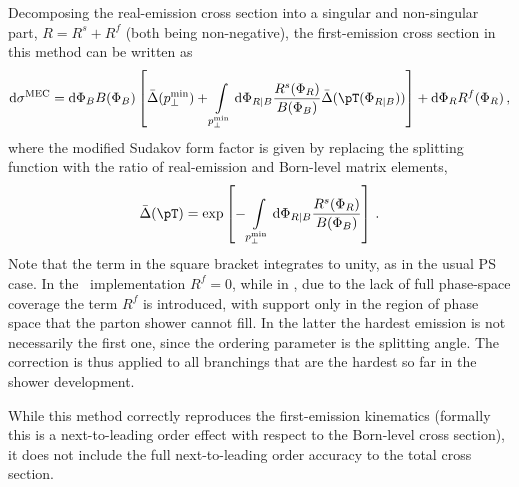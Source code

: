 Decomposing the real-emission cross section into a singular and non-singular 
part, $R=R^{s}+R^{f}$ (both being non-negative), the first-emission 
cross section in this method can be written as
\begin{equation}\label{Eq:MEC}
{\rm d}\sigma^{\rm MEC} =
{\rm d}\Phi_B B(\Phi_B)
\left[\bar\Delta(\pperpmin)+\int\limits_{\pperpmin}{\rm d}\Phi_{R|B}
      \frac{R^{s}(\Phi_R)}{B(\Phi_B)}
      \bar\Delta(\pT(\Phi_{R|B}))\right]
+ {\rm d}\Phi_R R^{f}(\Phi_R)\,,
\end{equation}
where the modified Sudakov form factor is given by replacing the splitting 
function with the ratio of real-emission and Born-level matrix elements,
\begin{equation}
\bar \Delta(\pT) = 
\exp\left[-\int\limits_{\pperpmin}{\rm d}\Phi_{R|B}
  \frac{R^{s}(\Phi_R)}{B(\Phi_B)}\right]\,.
\end{equation}
Note that the term in the square bracket integrates to unity,
as in the usual PS case.  In the \pythia\ implementation $R^{f}=0$, while in \herwig, due to 
the lack of full phase-space coverage the term $R^{f}$ is introduced, with 
support only in the region of phase space that the parton shower cannot fill.
In the latter the hardest emission is not necessarily the first one,
since the ordering parameter is the splitting angle.
The correction is thus applied
to all branchings that are the hardest so far in the shower development.

While this method correctly reproduces the first-emission kinematics (formally
this is a next-to-leading order effect with respect to the Born-level 
cross section), 
it does not include the full next-to-leading order accuracy to the total 
cross section.


